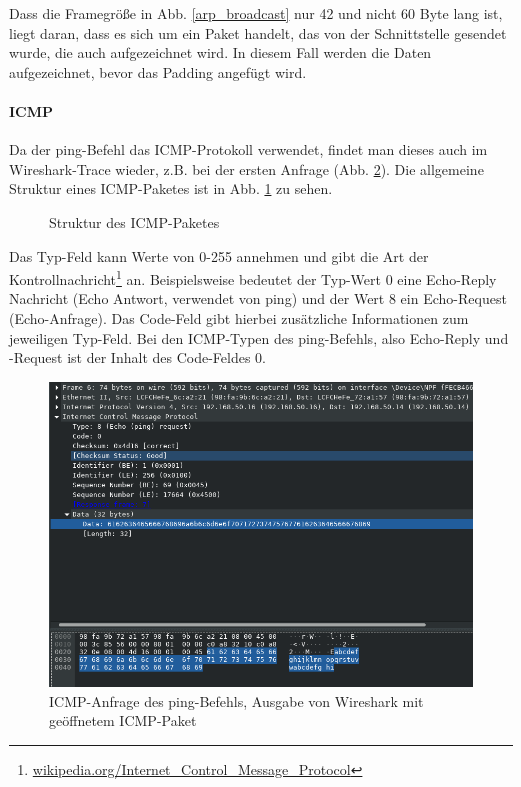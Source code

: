Dass die Framegröße in Abb. \ref{arp_broadcast} nur 42 und nicht 60 Byte lang ist, liegt daran, dass es sich um ein Paket handelt, das von der Schnittstelle gesendet wurde, die auch aufgezeichnet wird. In diesem Fall werden die Daten aufgezeichnet, bevor das Padding angefügt wird.\\

\paragraph{ICMP}
Da der ping-Befehl das ICMP-Protokoll verwendet, findet man dieses auch im Wireshark-Trace wieder, z.B. bei der ersten Anfrage (Abb. \ref{icmp_request}). Die allgemeine Struktur eines ICMP-Paketes ist in Abb. \ref{icmp_header} zu sehen.


\begin{figure}[H]
\centering
{}
\caption{Struktur des ICMP-Paketes}\label{icmp_header}
\end{figure}

Das Typ-Feld kann Werte von 0-255 annehmen und gibt die Art der Kontrollnachricht\footnote{\url{wikipedia.org/Internet_Control_Message_Protocol}} an. Beispielsweise bedeutet der Typ-Wert 0 eine Echo-Reply Nachricht (Echo Antwort, verwendet von ping) und der Wert 8 ein Echo-Request (Echo-Anfrage). Das Code-Feld gibt hierbei zusätzliche Informationen zum jeweiligen Typ-Feld. Bei den ICMP-Typen des ping-Befehls, also Echo-Reply und -Request ist der Inhalt des Code-Feldes 0.

\begin{figure}[H]
  \begin{center}
\includegraphics[width=\textwidth]{graphics/versuch/3_3/wireshark/ping_request}
    \caption{ICMP-Anfrage des ping-Befehls, Ausgabe von Wireshark mit geöffnetem ICMP-Paket}\label{icmp_request}
  \end{center}
\end{figure}

